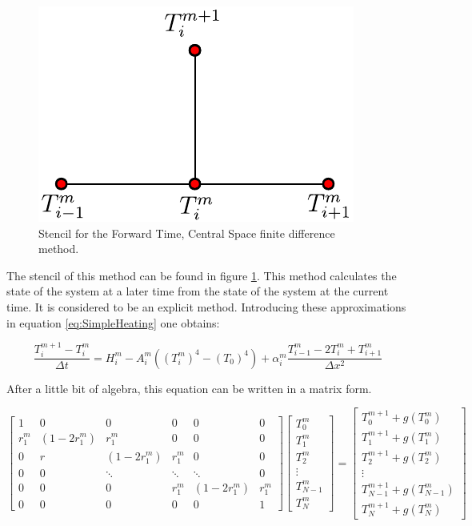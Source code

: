 \begin{figure}[h]
    \centering
    \includegraphics[width=0.35\columnwidth]{Stencils_FiniteDifferences/FTCS.pdf}
    \caption{Stencil for the Forward Time, Central Space finite difference method.}
    \label{fig:StencilFTCS}
\end{figure}

The stencil of this method can be found in figure \ref{fig:StencilFTCS}. This method calculates the state of the system at a later time from the state of the system at the current time. It is considered to be an explicit method. Introducing these approximations in equation \ref{eq:SimpleHeating} one obtains:

\begin{equation}
    \frac{T^{m+1}_i - T^m_i}{\Delta t} = H^m_i - A_i^m \left((T_i^m )^4 - (T_0)^4\right) +\alpha_i^m    \frac{T^{m}_{i-1}-2T^m_{i}+T^m_{i+1}}{\Delta x^2}
\end{equation}

After a little bit of algebra, this equation can be written in a matrix form.

$$
\begin{bmatrix}
         1 & 0 & 0 & 0 & 0 & 0 \\
         r^m_1 & \left(1-2r^m_1\right) & r^m_1 & 0 & 0 & 0 \\ 
         0 & r & \left(1-2r^m_1\right) & r^m_1 & 0 & 0 \\ 
         0 & 0 & \ddots & \ddots & \ddots & 0 \\
         0 & 0 & 0 & r^m_1 & \left(1-2r^m_1\right) & r^m_1 \\
         0 & 0 & 0 & 0 & 0 & 1 
     \end{bmatrix}
\begin{bmatrix}
         T^m_0  \\
         T^m_1 \\ 
         T^m_2  \\ 
         \vdots \\
         T^m_{N-1} \\
         T^m_N 
     \end{bmatrix}
     =
     \begin{bmatrix}
         T^{m+1}_0 + g(T^m_0) \\
         T^{m+1}_1 + g(T^m_1)\\ 
         T^{m+1}_2 + g(T^m_2)\\ 
         \vdots\\ 
         T^{m+1}_{N-1} + g(T^m_{N-1})\\
         T^{m+1}_{N} + g(T^m_{N}) 
     \end{bmatrix}
$$

